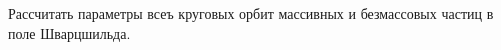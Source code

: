 \begin{tproblem}
  Рассчитать параметры всеъ круговых орбит массивных и безмассовых
  частиц в поле Шварцшильда.
\end{tproblem}
